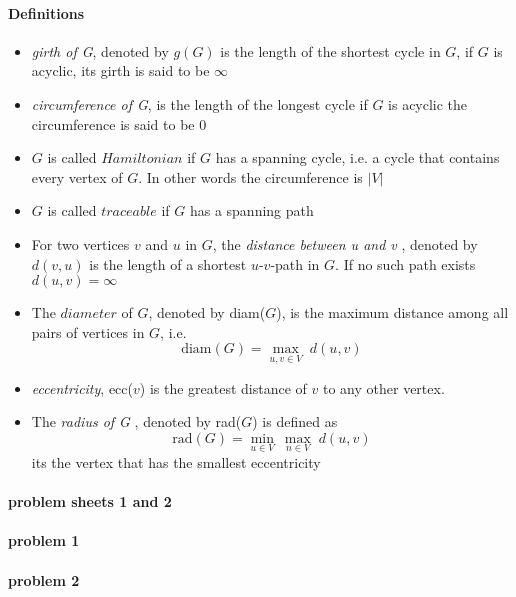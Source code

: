 \paragraph{Definitions} 
\begin{itemize}
    \item \textit{girth of G}, denoted by $ g(G) $ is the length of the shortest cycle
    in $ G $, if $ G $ is acyclic, its girth is said to be $ \infty $
    \item \textit{circumference of G}, is the length of the longest cycle
    if $ G $ is acyclic the circumference is said to be $0$
    \item $ G $ is called $ Hamiltonian $ if $ G $ has a spanning cycle, i.e. 
    a cycle that contains every vertex of $ G $. In other words the circumference is 
    $ |V|$
    \item $ G $ is called $ traceable $ if $ G $ has a spanning path
    \item For two vertices $ v $ and $ u $ in $ G $, the 
    \textit{distance between u and v }, denoted by $ d(v,u) $ is the length of 
    a shortest $u$-$v$-path in $ G $. If no such path exists $ d(u,v) = \infty $
    \item The $ diameter $ of $ G $, denoted by diam($G$), is the maximum distance 
    among all pairs of vertices in $ G $, i.e.
    $$ \text{diam}(G) = \underset{u,v \in V}{\max} \; d(u,v)$$
    \item \textit{eccentricity}, ecc($v$) is the greatest distance of $ v $ to any 
    other vertex.
    \item The \textit{radius of G }, denoted by rad($G$) is defined as 
    $$ \text{rad}(G) =  \underset{u \in V}{\min} \: \underset{n \in V}{\max} \;d(u,v) $$
    its the vertex that has the smallest eccentricity 

\end{itemize}


\paragraph{problem sheets 1 and 2}

\paragraph{problem 1}

\paragraph{problem 2}

